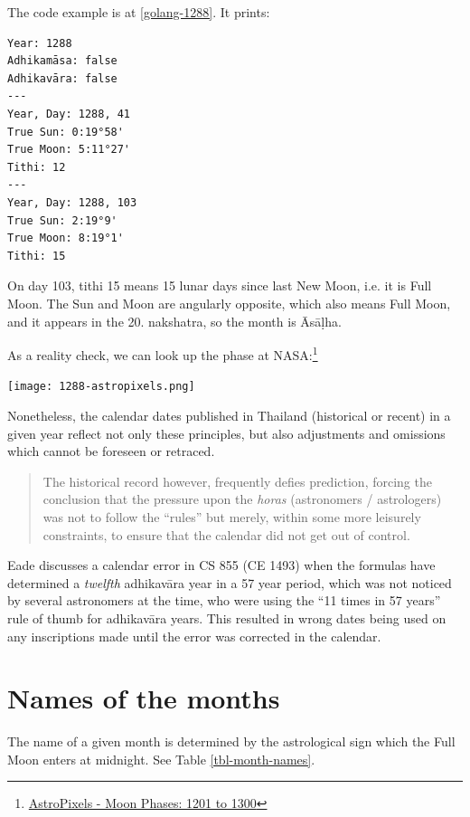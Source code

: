 \documentclass[11pt,oneside]{memoir-article}
\begin{document}
The code example is at \ref{golang-1288}. It prints:

\begin{verbatim}
Year: 1288
Adhikamāsa: false
Adhikavāra: false
---
Year, Day: 1288, 41
True Sun: 0:19°58'
True Moon: 5:11°27'
Tithi: 12
---
Year, Day: 1288, 103
True Sun: 2:19°9'
True Moon: 8:19°1'
Tithi: 15
\end{verbatim}

On day 103, tithi 15 means 15 lunar days since last New Moon, i.e. it is Full
Moon. The Sun and Moon are angularly opposite, which also means Full Moon, and
it appears in the 20. nakshatra, so the month is Āsāḷha.

As a reality check, we can look up the phase at NASA:\footnote{\href{http://astropixels.com/ephemeris/phasescat/phases1201.html}{AstroPixels - Moon Phases: 1201 to 1300}}

{\centering
\texttt{[image: 1288-astropixels.png]}
\par}

Nonetheless, the calendar dates published in Thailand (historical or
recent) in a given year reflect not only these principles, but also
adjustments and omissions which cannot be foreseen or retraced.

\begin{quote}
The historical record however, frequently defies prediction, forcing
the conclusion that the pressure upon the \emph{horas} (astronomers /
astrologers) was not to follow the ``rules'' but merely, within some
more leisurely constraints, to ensure that the calendar did not get
out of control.\autocite{eade1995calendrical}
\end{quote}

Eade discusses a calendar error in CS 855 (CE 1493) when the formulas have
determined a \emph{twelfth} adhikavāra year in a 57 year period, which was not
noticed by several astronomers at the time, who were using the ``11 times in 57
years'' rule of thumb for adhikavāra years. This resulted in wrong dates being
used on any inscriptions made until the error was corrected in the
calendar.\autocite{eade2007irregular}

\section{Names of the months}
\label{sec-3-1}

The name of a given month is determined by the astrological sign which
the Full Moon enters at midnight. See Table \ref{tbl-month-names}.
\end{document}
